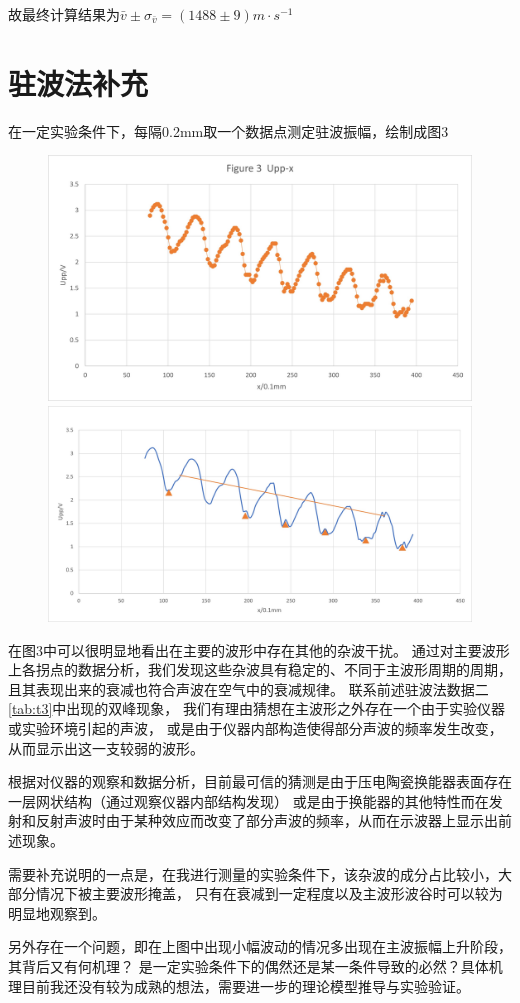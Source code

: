\documentclass[12pt, a4paper]{ctexart}
\begin{document}
故最终计算结果为$\bar{v} \pm \sigma_{\bar{v}} = (1488 \pm 9) m \cdot s^{-1}$

\section{驻波法补充}
在一定实验条件下，每隔0.2mm取一个数据点测定驻波振幅，绘制成图3
\begin{figure}[htb]
  \centering
  \includegraphics[width = 5in]{Figure_3.jpg}\\
  \includegraphics[width = 5in]{Figure_4.jpg}
\end{figure}

在图3中可以很明显地看出在主要的波形中存在其他的杂波干扰。
通过对主要波形上各拐点的数据分析，我们发现这些杂波具有稳定的、不同于主波形周期的周期，
且其表现出来的衰减也符合声波在空气中的衰减规律。
联系前述驻波法数据二\ref*{tab:t3}中出现的双峰现象，
我们有理由猜想在主波形之外存在一个由于实验仪器或实验环境引起的声波，
或是由于仪器内部构造使得部分声波的频率发生改变，从而显示出这一支较弱的波形。

根据对仪器的观察和数据分析，目前最可信的猜测是由于压电陶瓷换能器表面存在一层网状结构（通过观察仪器内部结构发现）
或是由于换能器的其他特性而在发射和反射声波时由于某种效应而改变了部分声波的频率，从而在示波器上显示出前述现象。

需要补充说明的一点是，在我进行测量的实验条件下，该杂波的成分占比较小，大部分情况下被主要波形掩盖，
只有在衰减到一定程度以及主波形波谷时可以较为明显地观察到。

另外存在一个问题，即在上图中出现小幅波动的情况多出现在主波振幅上升阶段，其背后又有何机理？
是一定实验条件下的偶然还是某一条件导致的必然？具体机理目前我还没有较为成熟的想法，需要进一步的理论模型推导与实验验证。
\end{document}
